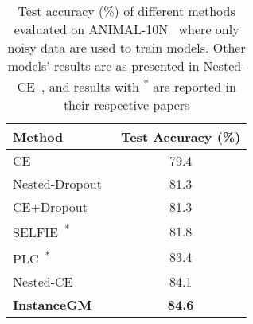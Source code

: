 \documentclass[10pt,twocolumn,letterpaper]{article}
\begin{document}
    \begin{table}[t]
        \centering
        \caption{Test accuracy (\%) of different methods evaluated on ANIMAL-10N~\cite{song2019selfie} where only noisy data are used to train models. Other models' results are as presented in  Nested-CE~\cite{chen2021boosting}, and results with \textsuperscript{*} are reported in their respective papers}
        \label{table:Animal10N}
        \begin{tabular}{l c}
            \toprule
            \bfseries Method & \bfseries Test Accuracy (\%) \\
            \midrule
            CE~\cite{zhang2021learning} & 79.4 \\
            Nested-Dropout~\cite{chen2021boosting} & 81.3 \\
            CE+Dropout~\cite{chen2021boosting} & 81.3\\
            SELFIE~\cite{song2019selfie}\textsuperscript{*} & 81.8 \\
            PLC~\cite{zhang2021learning}\textsuperscript{*} & 83.4 \\
            Nested-CE~\cite{chen2021boosting} & 84.1 \\
            \midrule
            \rowcolor{Gray!25} \textbf{InstanceGM} & \textbf{84.6} \\
            \bottomrule
        \end{tabular}
\end{table}


    
    
    


    
\end{document}
